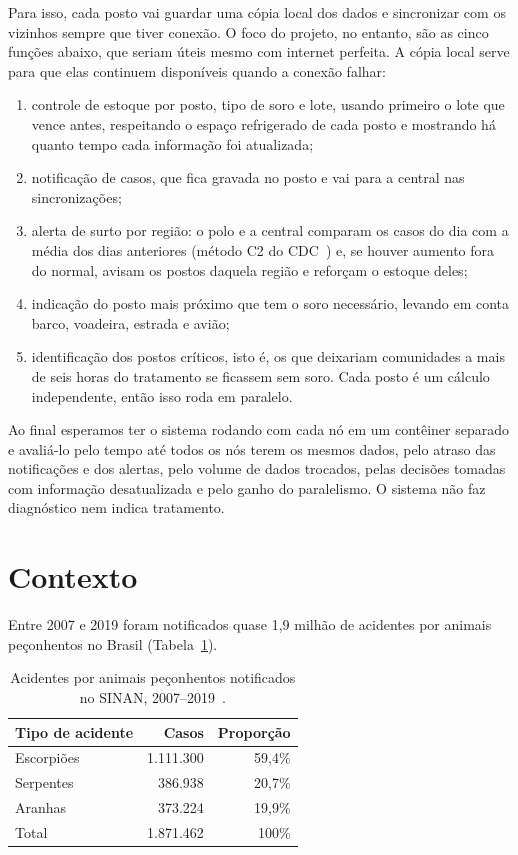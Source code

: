 \documentclass[a4paper,12pt]{article}
\begin{document}
Para isso, cada posto vai guardar uma cópia local dos dados e sincronizar com
os vizinhos sempre que tiver conexão. O foco do projeto, no entanto, são as
cinco funções abaixo, que seriam úteis mesmo com internet perfeita. A cópia
local serve para que elas continuem disponíveis quando a conexão falhar:
\begin{enumerate}
  \item controle de estoque por posto, tipo de soro e lote, usando primeiro o
        lote que vence antes, respeitando o espaço refrigerado de cada posto e
        mostrando há quanto tempo cada informação foi atualizada;
  \item notificação de casos, que fica gravada no posto e vai para a central
        nas sincronizações;
  \item alerta de surto por região: o polo e a central comparam os casos do
        dia com a média dos dias anteriores (método C2 do CDC~\cite{hutwagner2003})
        e, se houver aumento fora do normal, avisam os postos daquela região e
        reforçam o estoque deles;
  \item indicação do posto mais próximo que tem o soro necessário, levando em
        conta barco, voadeira, estrada e avião;
  \item identificação dos postos críticos, isto é, os que deixariam
        comunidades a mais de seis horas do tratamento se ficassem sem soro.
        Cada posto é um cálculo independente, então isso roda em paralelo.
\end{enumerate}

Ao final esperamos ter o sistema rodando com cada nó em um contêiner separado e
avaliá-lo pelo tempo até todos os nós terem os mesmos dados, pelo atraso das
notificações e dos alertas, pelo volume de dados trocados, pelas decisões
tomadas com informação desatualizada e pelo ganho do paralelismo. O sistema não
faz diagnóstico nem indica tratamento.

\section{Contexto}
\label{sec:contexto}

Entre 2007 e 2019 foram notificados quase 1,9 milhão de acidentes por animais
peçonhentos no Brasil (Tabela~\ref{tab:sinan}).

\begin{table}[H]
  \centering
  \caption{Acidentes por animais peçonhentos notificados no SINAN, 2007--2019~\cite{completude2023}.}
  \label{tab:sinan}
  \begin{tabular}{lrr}
    \toprule
    Tipo de acidente & Casos & Proporção \\
    \midrule
    Escorpiões & 1.111.300 & 59,4\% \\
    Serpentes  &   386.938 & 20,7\% \\
    Aranhas    &   373.224 & 19,9\% \\
    \midrule
    Total & 1.871.462 & 100\% \\
    \bottomrule
  \end{tabular}
\end{table}
\end{document}
